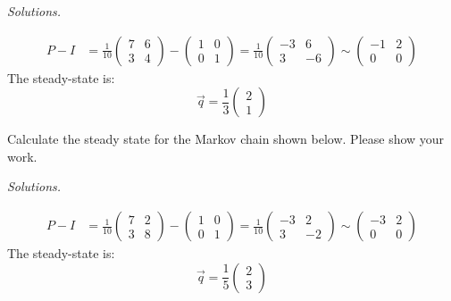     \ifnum {} {\color{DarkBlue} \textit{Solutions.} 
    
        \begin{align}
            P-I &= \frac{1}{10} \begin{pmatrix} 7 & 6 \\ 3 & 4\end{pmatrix} - \begin{pmatrix} 1&0\\0&1 \end{pmatrix} = \frac{1}{10}\begin{pmatrix}-3&6\\3&-6 \end{pmatrix} \sim \begin{pmatrix}-1&2\\0&0 \end{pmatrix}
        \end{align}
        The steady-state is: 
        $$ \vec q = \frac{1}{3}\begin{pmatrix}2\\1 \end{pmatrix}$$
        } 
    \fi
\fi

\ifnum {}
    \question[2] Calculate the steady state for the Markov chain shown below. Please show your work.  
        \begin{center}
        \end{center}    

    \ifnum {} {\color{DarkBlue} \textit{Solutions.} 
    
        \begin{align}
            P-I &= \frac{1}{10} \begin{pmatrix} 7 & 2 \\ 3 & 8\end{pmatrix} - \begin{pmatrix} 1&0\\0&1 \end{pmatrix} = \frac{1}{10}\begin{pmatrix}-3&2\\3&-2 \end{pmatrix} \sim \begin{pmatrix}-3&2\\0&0 \end{pmatrix}
        \end{align}
        The steady-state is: 
        $$ \vec q = \frac{1}{5}\begin{pmatrix}2\\3 \end{pmatrix}$$
        } 
    \else
    \vfill         
    \fi
\fi


